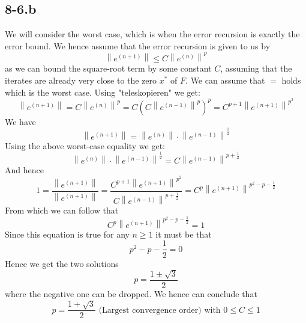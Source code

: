 \documentclass{article}
\begin{document}
\subsection*{8-6.b}
We will consider the worst case, which is when the error recursion is exactly the error bound. We hence assume that the error recursion is given to us by 
\begin{equation*}
    \left\lVert e^{\left(n + 1\right)}\right\rVert \leq C\left\lVert e^{\left(n\right)}\right\rVert^{p}
\end{equation*}
as we can bound the square-root term by some constant $C$, assuming that the iterates are already very close to the zero $x^{*}$ of $F$. We can assume that $=$ holds which is the worst case. Using "teleskopieren" we get:
\begin{equation*}
     \left\lVert e^{\left(n + 1\right)}\right\rVert = C\left\lVert e^{\left(n\right)}\right\rVert^{p} =C\left( C \left\lVert e^{\left(n-1\right)}\right\rVert^{p}\right)^{p} = C^{p + 1} \left\lVert e^{\left(n+1\right)}\right\rVert^{p^{2}}
\end{equation*}
We have 
\begin{equation*}
    \left\lVert e^{\left(n+1\right)}\right\rVert = \left\lVert e^{\left(n\right)}\right\rVert \cdot \left\lVert e^{\left(n-1\right)}\right\rVert^{\frac{1}{2}}
\end{equation*}
Using the above worst-case equality we get:
\begin{equation*}
    \left\lVert e^{\left(n\right)}\right\rVert \cdot \left\lVert e^{\left(n-1\right)}\right\rVert^{\frac{1}{2}} = C\left\lVert e^{\left(n-1\right)}\right\rVert^{p + \frac{1}{2}}
\end{equation*}
And hence 
\begin{equation*}
    1=\frac{ \left\lVert e^{\left(n+1\right)}\right\rVert}{ \left\lVert e^{\left(n+1\right)}\right\rVert}=\frac{C^{p + 1} \left\lVert e^{\left(n+1\right)}\right\rVert^{p^{2}}}{C\left\lVert e^{\left(n-1\right)}\right\rVert^{p + \frac{1}{2}}} = C^{p}\left\lVert e^{\left(n+1\right)}\right\rVert^{p^{2} -p -\frac{1}{2}}
\end{equation*}
From which we can follow that 
\begin{equation*}
    C^{p}\left\lVert e^{\left(n+1\right)}\right\rVert^{p^{2} -p -\frac{1}{2}} = 1
\end{equation*}
Since this equation is true for any $n \geq 1$ it must be that 
\begin{equation*}
    p^{2}-p-\frac{1}{2} = 0
\end{equation*}
Hence we get the two solutions
\begin{equation*}
    p = \frac{1 \pm \sqrt{3}}{2}
\end{equation*}
where the negative one can be dropped. We hence can conclude that
\begin{equation*}
    p = \frac{1 + \sqrt{3}}{2} \text{ (Largest convergence order) with } 0 \leq C \leq 1
\end{equation*}
\end{document}

